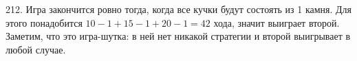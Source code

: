 212. Игра закончится ровно тогда, когда все кучки будут состоять из 1 камня. Для этого понадобится $10-1+15-1+20-1=42$ хода, значит выиграет второй. Заметим, что это игра-шутка: в ней нет никакой стратегии и второй выигрывает в любой случае.\\
